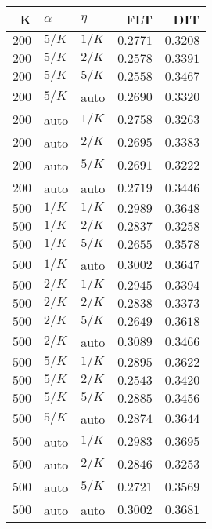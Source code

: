 \begin{table}
\begin{spacing}{1.2}
{\begin{tabular}{rll|rr}
\bottomrule
\end{tabular}
} \hfill \parbox{.45\linewidth}{\centering \begin{tabular}{rll|rr}
\toprule
    K &  $\alpha$ &    $\eta$ &           FLT &           DIT \\
\midrule
$200$ &  $5/K$ &  $1/K$ &      $0.2771$ &      $0.3208$ \\
$200$ &  $5/K$ &  $2/K$ &      $0.2578$ &      $0.3391$ \\
$200$ &  $5/K$ &  $5/K$ &      $0.2558$ &      $0.3467$ \\
$200$ &  $5/K$ &   auto &      $0.2690$ &      $0.3320$ \\
$200$ &   auto &  $1/K$ &      $0.2758$ &      $0.3263$ \\
$200$ &   auto &  $2/K$ &      $0.2695$ &      $0.3383$ \\
$200$ &   auto &  $5/K$ &      $0.2691$ &      $0.3222$ \\
$200$ &   auto &   auto &      $0.2719$ &      $0.3446$ \\
\myrowcolor $500$ &  $1/K$ &  $1/K$ &      $0.2989$ &      $0.3648$ \\
$500$ &  $1/K$ &  $2/K$ &      $0.2837$ &      $0.3258$ \\
$500$ &  $1/K$ &  $5/K$ &      $0.2655$ &      $0.3578$ \\
$500$ &  $1/K$ &   auto &      $0.3002$ &      $0.3647$ \\
$500$ &  $2/K$ &  $1/K$ &      $0.2945$ &      $0.3394$ \\
$500$ &  $2/K$ &  $2/K$ &      $0.2838$ &      $0.3373$ \\
$500$ &  $2/K$ &  $5/K$ &      $0.2649$ &      $0.3618$ \\
$500$ &  $2/K$ &   auto & $\bm{0.3089}$ &      $0.3466$ \\
$500$ &  $5/K$ &  $1/K$ &      $0.2895$ &      $0.3622$ \\
$500$ &  $5/K$ &  $2/K$ &      $0.2543$ &      $0.3420$ \\
$500$ &  $5/K$ &  $5/K$ &      $0.2885$ &      $0.3456$ \\
$500$ &  $5/K$ &   auto &      $0.2874$ &      $0.3644$ \\
$500$ &   auto &  $1/K$ &      $0.2983$ & $\bm{0.3695}$ \\
$500$ &   auto &  $2/K$ &      $0.2846$ &      $0.3253$ \\
$500$ &   auto &  $5/K$ &      $0.2721$ &      $0.3569$ \\
$500$ &   auto &   auto &      $0.3002$ &      $0.3681$ \\
\bottomrule
\end{tabular}
}
\end{spacing}
\end{table}
